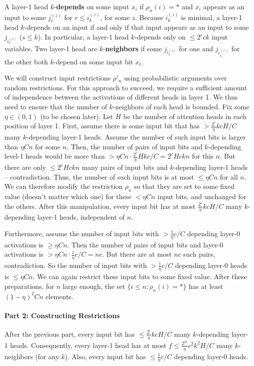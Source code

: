 \documentclass[11pt,a4paper]{article}
\begin{document}
A layer-1 head $k$-\textbf{depends} on some input $x_i$ if $\rho_n(i) = *$ and $x_i$ appears as an input to some $j_r^{(z)}$ for $r \leq i_k^{(z)}$, for some $z$.
Because $i_k^{(z)}$ is minimal, a layer-1 head $k$-depends on an input if and only if that input appears as an input to some $j_{i_s^{(z)}}$ ($s \leq k$).
In particular, a layer-1 head $k$-depends only on $\leq 2^c ck$ input variables.
Two layer-1 head are $k$-\textbf{neighbors} if some $j_{i_s^{(z)}}$ for one and $j_{i_{s'}^{(z')}}$ for the other both $k$-depend on some input bit $x_l$.

We will construct input restrictions $\rho'_n$ using probabilistic arguments over random restrictions.
For this approach to succeed, we require a  sufficient amount of independence between the activations of different heads in layer 1.
We thus need to ensure that the number of $k$-neighbors of each head is bounded.
Fix some $\eta \in (0,1)$ (to be chosen later).
Let $H$ be the number of attention heads in each position of layer 1.
First, assume there is some input bit that has $>\frac{2^c}{\eta}kcH/C$ many $k$-depending layer-1 heads.
Assume the number of such input bits is larger than $\eta Cn$ for some $n$.
Then, the number of pairs of input bits and $k$-depending level-1 heads would be more than $> \eta C n \cdot \frac{2^c}{\eta} H k c/C = 2^c Hckn$ for this $n$.
But there are only $\leq 2^c Hckn$ many pairs of input bits and $k$-depending layer-1 heads -- contradiction.
Thus, the number of such input bits is at most $\leq \eta Cn$ for all $n$.
We can therefore modify the restriction $\rho_n$ so that they are set to some fixed value (doesn't matter which one) for these $<\eta Cn$ input bits, and unchanged for the others.
After this manipulation, every input bit has at most $\frac{2^c}{\eta}kcH/C$ many $k$-depending layer-1 heads, independent of $n$.

Furthermore, assume the number of input bits with $> \frac{1}{\eta} c/C$ depending layer-0 activations is $\geq \eta Cn$.
Then the number of pairs of input bits and layer-0 activations is $>\eta Cn \cdot \frac{1}{\eta} c/C = nc$.
But there are at most $nc$ such pairs, contradiction.
So the number of input bits with $> \frac{1}{\eta} c/C$ depending layer-0 heads is $\leq \eta Cn$.
We can again restrict these input bits to some fixed value. %
After these preparations, for $n$ large enough, the set $\{i \leq n: \rho_n(i) = *\}$ has at least $(1-\eta)^2 C n$ elements.

\paragraph{Part 2: Constructing Restrictions}
After the previous part, every input bit has $\leq \frac{2^c}{\eta}kcH/C$ many $k$-depending layer-1 heads.
Consequently, every layer-1 head has at most $f \leq \frac{2^{2c}}{\eta}c^2k^2H/C$ many $k$-neighbors (for any $k$).
Also, every input bit has $\leq \frac{1}{\eta}c/C$ depending layer-0 heads.
\end{document}
